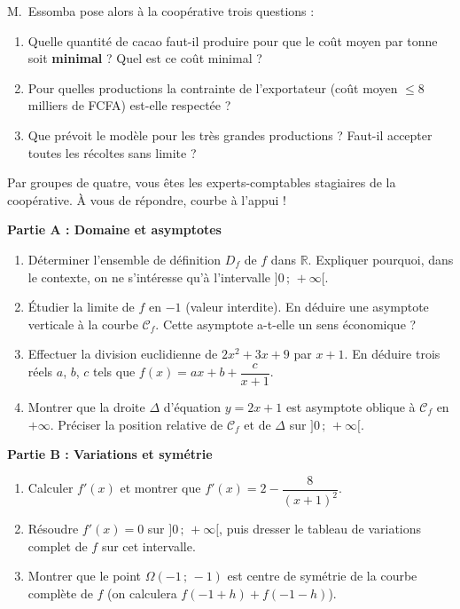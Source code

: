 \documentclass[11pt]{article}
\newcounter{popsec}
\newcounter{popsub}
\newcommand{\courssub}[1]{%
  \stepcounter{popsub}%
  \par\vspace{9pt}\noindent{\popxbold\fontsize{11.5}{13}\selectfont\color{popink}{\color{poporange}\thepopsec.\thepopsub}\hspace{6pt}#1}\par\nopagebreak\vspace{4pt}
}
\begin{document}
M.~Essomba pose alors à la coopérative trois questions :
\begin{enumerate}
\item Quelle quantité de cacao faut-il produire pour que le coût moyen par tonne soit \textbf{minimal} ? Quel est ce coût minimal ?
\item Pour quelles productions la contrainte de l'exportateur (coût moyen $\leq 8$ milliers de FCFA) est-elle respectée ?
\item Que prévoit le modèle pour les très grandes productions ? Faut-il accepter toutes les récoltes sans limite ?
\end{enumerate}

Par groupes de quatre, vous êtes les experts-comptables stagiaires de la coopérative. À vous de répondre, courbe à l'appui !

\courssub{Consignes}

\textbf{Partie A : Domaine et asymptotes}
\begin{enumerate}
\item Déterminer l'ensemble de définition $D_f$ de $f$ dans $\mathbb{R}$. Expliquer pourquoi, dans le contexte, on ne s'intéresse qu'à l'intervalle $]0\,;\,+\infty[$.
\item Étudier la limite de $f$ en $-1$ (valeur interdite). En déduire une asymptote verticale à la courbe $\mathcal{C}_f$. Cette asymptote a-t-elle un sens économique ?
\item Effectuer la division euclidienne de $2x^2+3x+9$ par $x+1$. En déduire trois réels $a$, $b$, $c$ tels que $f(x) = ax + b + \dfrac{c}{x+1}$.
\item Montrer que la droite $\Delta$ d'équation $y = 2x+1$ est asymptote oblique à $\mathcal{C}_f$ en $+\infty$. Préciser la position relative de $\mathcal{C}_f$ et de $\Delta$ sur $]0\,;\,+\infty[$.
\end{enumerate}

\textbf{Partie B : Variations et symétrie}
\begin{enumerate}[resume]
\item Calculer $f'(x)$ et montrer que $f'(x) = 2 - \dfrac{8}{(x+1)^2}$.
\item Résoudre $f'(x) = 0$ sur $]0\,;\,+\infty[$, puis dresser le tableau de variations complet de $f$ sur cet intervalle.
\item Montrer que le point $\Omega(-1\,;\,-1)$ est centre de symétrie de la courbe complète de $f$ (on calculera $f(-1+h)+f(-1-h)$).
\end{enumerate}
\end{document}
